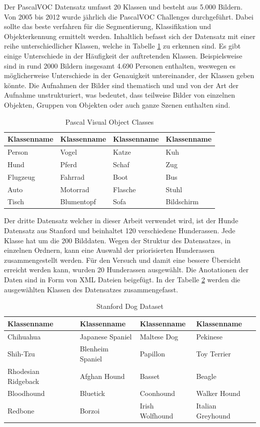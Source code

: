 Der PascalVOC Datensatz umfasst 20 Klassen und besteht aus 5.000 Bildern. Von 2005 bis 2012 wurde jährlich die PascalVOC Challenges durchgeführt. Dabei sollte das beste verfahren für die Segmentierung, Klassifikation und Objekterkennung ermittelt werden. Inhaltlich befasst sich der Datensatz mit einer reihe unterschiedlicher Klassen, welche in Tabelle \ref{tab:pvoc} zu erkennen sind. Es gibt einige Unterschiede in der Häufigkeit der auftretenden Klassen. Beispielsweise sind in rund 2000 Bildern insgesamt 4.690 Personen enthalten, weswegen es möglicherweise Unterschiede in der Genauigkeit untereinander, der Klassen geben könnte. Die Aufnahmen der Bilder sind thematisch und und von der Art der Aufnahme unstrukturiert, was bedeutet, dass teilweise Bilder von einzelnen Objekten, Gruppen von Objekten oder auch ganze Szenen enthalten sind.
\begin{table}
[h]
\caption{Pascal Visual Object Classes \cite{pascal-voc-2007}}
\centering
\begin{tabular}{|l|l|l|l|}
\hline
Klassenname & Klassenname & Klassenname & Klassenname\\
\hline
Person & Vogel & Katze & Kuh\\
Hund & Pferd & Schaf & Zug\\
Flugzeug & Fahrrad & Boot & Bus\\
Auto & Motorrad & Flasche & Stuhl\\
Tisch & Blumentopf & Sofa & Bildschirm\\
\hline
\end{tabular}
\label{tab:pvoc}
\end{table}
Der dritte Datensatz welcher in dieser Arbeit verwendet wird, ist der Hunde Datensatz aus Stanford und beinhaltet 120 verschiedene Hunderassen. Jede Klasse hat um die 200 Bilddaten. Wegen der Struktur des Datensatzes, in einzelnen Ordnern, kann eine Auswahl der priorisierten Hunderassen zusammengestellt werden. Für den Versuch und damit eine bessere Übersicht erreicht werden kann, wurden 20 Hunderassen ausgewählt. Die Anotationen der Daten sind in Form von XML Dateien beigefügt. In der Tabelle \ref{tab:sdd} werden die ausgewählten Klassen des Datensatzes zusammengefasst.
\begin{table}
[h]
\caption{Stanford Dog Dataset \cite{KhoslaYaoJayadevaprakashFeiFei_FGVC2011}}
\label{tab:sdd}
\centering
\begin{tabular}{|l|l|l|l|}
\hline
Klassenname & Klassenname & Klassenname & Klassenname\\
\hline
Chihuahua & Japanese Spaniel & Maltese Dog & Pekinese\\
Shih-Tzu & Blenheim Spaniel & Papillon & Toy Terrier\\
Rhodesian Ridgeback & Afghan Hound & Basset & Beagle\\
Bloodhound & Bluetick & Coonhound & Walker Hound\\
Redbone & Borzoi & Irish Wolfhound & Italian Greyhound\\
\hline
\end{tabular}
\end{table}

